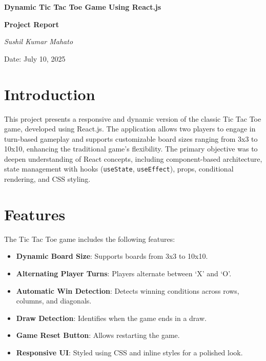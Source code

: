 \documentclass[a4paper,12pt]{article}
\begin{document}
\begin{titlepage}
    \centering
    \vspace*{2cm}
    {\Huge\bfseries Dynamic Tic Tac Toe Game Using React.js \par}
    \vspace{1.5cm}
    {\Large\bfseries Project Report \par}
    \vspace{2cm}
    {\large\itshape Sushil Kumar Mahato \par}
    \vspace{0.5cm}
    {\large Date: July 10, 2025 \par}
    \vspace{2cm}
    \vfill
\end{titlepage}

\section{Introduction}
This project presents a responsive and dynamic version of the classic Tic Tac Toe game, developed using React.js. The application allows two players to engage in turn-based gameplay and supports customizable board sizes ranging from 3x3 to 10x10, enhancing the traditional game’s flexibility. The primary objective was to deepen understanding of React concepts, including component-based architecture, state management with hooks (\texttt{useState}, \texttt{useEffect}), props, conditional rendering, and CSS styling.

\section{Features}
The Tic Tac Toe game includes the following features:
\begin{itemize}
    \item \textbf{Dynamic Board Size}: Supports boards from 3x3 to 10x10.
    \item \textbf{Alternating Player Turns}: Players alternate between `X' and `O'.
    \item \textbf{Automatic Win Detection}: Detects winning conditions across rows, columns, and diagonals.
    \item \textbf{Draw Detection}: Identifies when the game ends in a draw.
    \item \textbf{Game Reset Button}: Allows restarting the game.
    \item \textbf{Responsive UI}: Styled using CSS and inline styles for a polished look.
\end{itemize}
\end{document}
